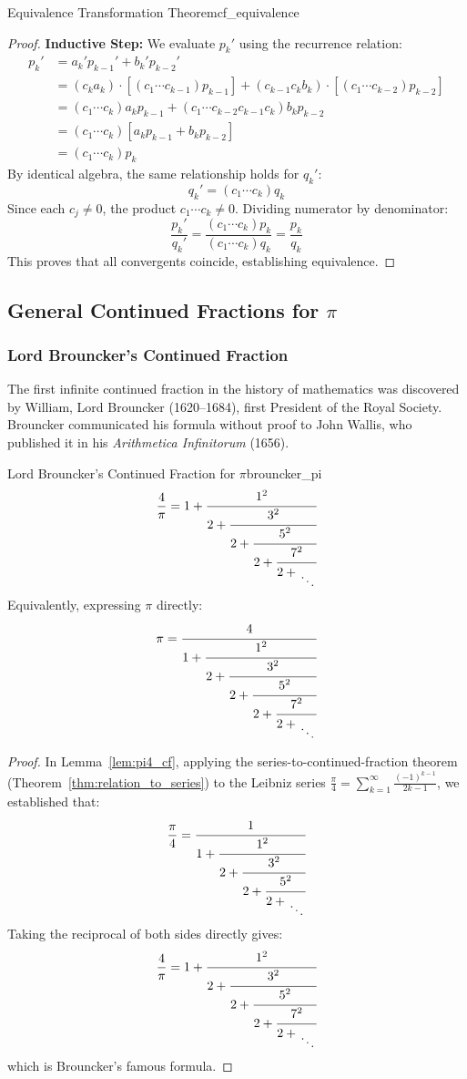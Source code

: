 \documentclass[a4paper]{article}
\begin{document}
\begin{mytheorem}{Equivalence Transformation Theorem}{cf_equivalence}
\begin{proof}
    \textbf{Inductive Step:}
    We evaluate $p_k'$ using the recurrence relation:
    \begin{align*}
      p_k' & = a_k' p_{k-1}' + b_k' p_{k-2}' \\
      & = (c_k a_k) \cdot \left[ (c_1 \cdots c_{k-1}) p_{k-1} \right] + (c_{k-1} c_k b_k) \cdot \left[ (c_1 \cdots c_{k-2}) p_{k-2} \right] \\
      & = (c_1 \cdots c_k) a_k p_{k-1} + (c_1 \cdots c_{k-2} c_{k-1} c_k) b_k p_{k-2} \\
      & = (c_1 \cdots c_k) [ a_k p_{k-1} + b_k p_{k-2} ] \\
      & = (c_1 \cdots c_k) p_k
    \end{align*}
    By identical algebra, the same relationship holds for $q_k'$:
    \[
      q_k' = (c_1 \cdots c_k) q_k
    \]
    Since each $c_j \ne 0$, the product $c_1 \cdots c_k \ne 0$.
    Dividing numerator by denominator:
    \[
      \frac{p_k'}{q_k'} = \frac{(c_1 \cdots c_k) p_k}{(c_1 \cdots c_k) q_k} = \frac{p_k}{q_k}
    \]
    This proves that all convergents coincide, establishing equivalence.
  \end{proof}
\end{mytheorem}

\subsection{General Continued Fractions for \texorpdfstring{$\pi$}{pi}}\label{cf:subsec:pi}

\subsubsection{Lord Brouncker's Continued Fraction}
The first infinite continued fraction in the history of mathematics was discovered by William, Lord Brouncker (1620--1684), first President of the Royal Society.
Brouncker communicated his formula without proof to John Wallis, who published it in his \emph{Arithmetica Infinitorum} (1656).

\begin{mylemma}{Lord Brouncker's Continued Fraction for \texorpdfstring{$\pi$}{pi}}{brouncker_pi}
  \[
    \frac{4}{\pi} = 1 + \cfrac{1^2}{2 + \cfrac{3^2}{2 + \cfrac{5^2}{2 + \cfrac{7^2}{2 + \CFDots}}}}
  \]
  Equivalently, expressing $\pi$ directly:
  \[
    \pi = \cfrac{4}{1 + \cfrac{1^2}{2 + \cfrac{3^2}{2 + \cfrac{5^2}{2 + \cfrac{7^2}{2 + \CFDots}}}}}
  \]

  \begin{proof}
    In Lemma~\ref{lem:pi4_cf}, applying the series-to-continued-fraction theorem (Theorem~\ref{thm:relation_to_series}) to the Leibniz series $\frac{\pi}{4} = \sum_{k=1}^\infty \frac{(-1)^{k-1}}{2k-1}$, we established that:
    \[
      \frac{\pi}{4} = \cfrac{1}{1 + \cfrac{1^2}{2 + \cfrac{3^2}{2 + \cfrac{5^2}{2 + \CFDots}}}}
    \]
    Taking the reciprocal of both sides directly gives:
    \[
      \frac{4}{\pi} = 1 + \cfrac{1^2}{2 + \cfrac{3^2}{2 + \cfrac{5^2}{2 + \cfrac{7^2}{2 + \CFDots}}}}
    \]
    which is Brouncker's famous formula.
  \end{proof}
\end{mylemma}
\end{document}
